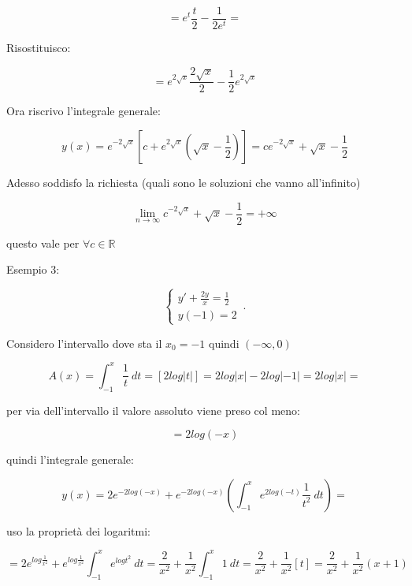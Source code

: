 \documentclass[11pt]{article}
\begin{document}
\[
    = e ^{t} \frac{t}{2} - \frac{1}{2 e ^{t}} =
\]

Risostituisco:

\[
    = e ^{2 \sqrt{x}} \frac{2 \sqrt{x}}{2} - \frac{1}{2} e ^{2 \sqrt{x}}
\]

Ora riscrivo l'integrale generale:

\[
    y(x) = e ^{-2 \sqrt{x}}[ c + e ^{2 \sqrt{x}}(\sqrt{x}- \frac{1}{2} )]= c e ^{-2 \sqrt{x}}+ \sqrt{x} - \frac{1}{2} 
\]

Adesso soddisfo la richiesta (quali sono le soluzioni che vanno all'infinito)

\[
    \lim_{n \to \infty} c ^{-2 \sqrt{x}} + \sqrt{x} - \frac{1}{2} = +\infty
\]

questo vale per $\forall c \in \mathbb{R}$


Esempio 3:

\begin{equation}
    \begin{cases}
      y' + \frac{2y}{x} = \frac{1}{2} \\
      y(-1)=2
    \end{cases}\,.
\end{equation}

Considero l'intervallo dove sta il $x_0=-1$ quindi $(-\infty,0)$

\[
    A(x) = \int_{{-1}}^{{x}} {\frac{1}{t} } \: d{t} {} = [2 log|t|] = 2 log|x| - 2 log|-1| = 2 log|x| = 
\]

per via dell'intervallo il valore assoluto viene preso col meno:

\[
    =2 log(-x)  
\]

quindi l'integrale generale:

\[
    y(x) = 2 e ^{-2log(-x)}+ e^{-2log(-x)}(\int_{{-1}}^{{x}} {e ^{2log(-t)}\frac{1}{t ^{2}} } \: d{t} {})=
\]

uso la proprietà dei logaritmi:

\[
    = 2 e ^{log \frac{1}{x ^{2}} }+ e ^{log \frac{1}{x ^{2}} }\int_{{-1}}^{{x}} {e ^{log t ^{2}}} \: d{t} {}= \frac{2}{x ^{2}} + \frac{1}{x ^{2}} \int_{{-1}}^{{x}} {1} \: d{t} {} = \frac{2}{x ^{2}} + \frac{1}{x ^{2}} [t] = \frac{2 }{x ^{2}} + \frac{1}{x ^{2}} (x+1)
\]
\end{document}
